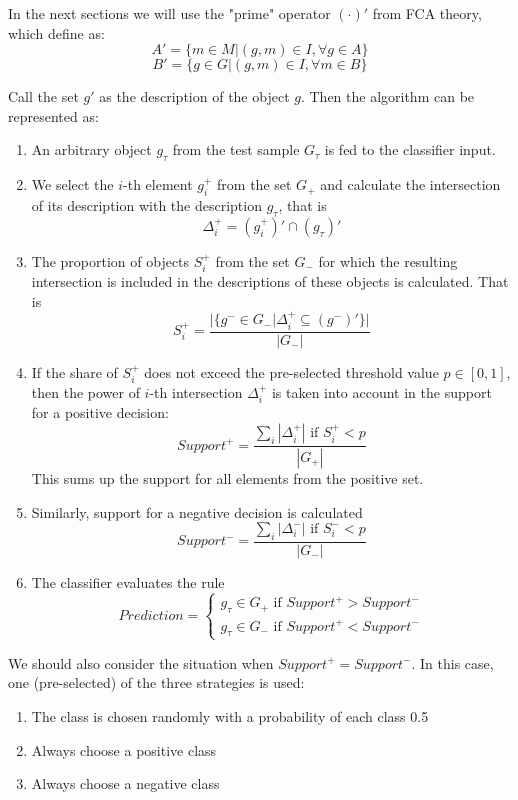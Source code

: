 \documentclass{article}
\begin{document}
In the next sections we will use the "prime" operator $({\cdot})'$ from FCA theory, which define as:
$$A' = \{ m \in M | (g,m) \in I, \forall g \in A \}$$
$$B' = \{ g \in G | (g,m) \in I, \forall m \in B \}$$

Call the set $g'$ as the description of the object $g$. Then the algorithm can be represented as:

\begin{enumerate}
    \item An arbitrary object $g_\tau$ from the test sample $G_\tau$ is fed to the classifier input.
    \item We select the $i$-th element $g_i^+$ from the set $G_+$ and calculate the intersection of its description with the description $g_\tau$, that is
    $$ \Delta_i^+ = (g_i^+)' \cap (g_\tau)'$$
    \item The proportion of objects $S_i^+$ from the set $G_-$ for which the resulting intersection is included in the descriptions of these objects is calculated. That is
    $$S_i^+ = \frac{|\{g^-\in G_-|\Delta_i^+ \subseteq (g^- )'\}|}{|G_-|}$$
    \item If the share of $S_i^+$ does not exceed the pre-selected threshold value $p \in [0, 1]$, then the power of $i$-th intersection $\Delta_i^+$ is taken into account in the support for a positive decision:
    $$Support^+ = \frac{\sum_i |\Delta_i^+| \text{ if } S_i^+<p}{|G_+|}$$
    This sums up the support for all elements from the positive set.
    \item Similarly, support for a negative decision is calculated
    $$Support^- = \frac{\sum_i |\Delta_i^-| \text{ if } S_i^-<p}{|G_-|}$$
    \item The classifier evaluates the rule
    $$Prediction = \begin{cases}
    g_\tau \in G_+ \text{ if } Support^+ > Support^-\\
    g_\tau \in G_- \text{ if } Support^+ < Support^-
    \end{cases}$$
\end{enumerate}
We should also consider the situation when $Support^+ = Support^-$. In this case, one (pre-selected) of the three strategies is used:
\begin{enumerate}
    \item The class is chosen randomly with a probability of each class 0.5
    \item Always choose a positive class
    \item Always choose a negative class
\end{enumerate}
\end{document}
